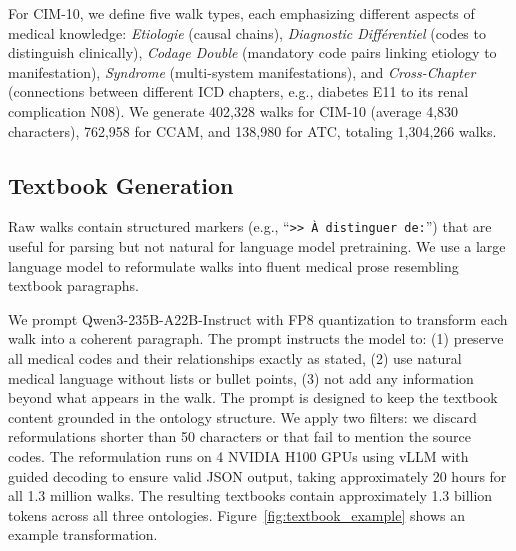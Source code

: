 \begin{reviewread}
For CIM-10, we define five walk types, each emphasizing different aspects of medical knowledge: \textit{Etiologie} (causal chains), \textit{Diagnostic Diff\'erentiel} (codes to distinguish clinically), \textit{Codage Double} (mandatory code pairs linking etiology to manifestation), \textit{Syndrome} (multi-system manifestations), and \textit{Cross-Chapter} (connections between different ICD chapters, e.g., diabetes E11 to its renal complication N08). We generate 402,328 walks for CIM-10 (average 4,830 characters), 762,958 for CCAM, and 138,980 for ATC, totaling 1,304,266 walks.
\end{reviewread}

\subsection{Textbook Generation}
\label{sec:textbook}

\begin{reviewread}
Raw walks contain structured markers (e.g., ``\texttt{>> \`A distinguer de:}'') that are useful for parsing but not natural for language model pretraining. We use a large language model to reformulate walks into fluent medical prose resembling textbook paragraphs.
\end{reviewread}

\begin{reviewread}
We prompt Qwen3-235B-A22B-Instruct \citep{yang2025qwen3} with FP8 quantization to transform each walk into a coherent paragraph. The prompt instructs the model to: (1) preserve all medical codes and their relationships exactly as stated, (2) use natural medical language without lists or bullet points, (3) not add any information beyond what appears in the walk. The prompt is designed to keep the textbook content grounded in the ontology structure. We apply two filters: we discard reformulations shorter than 50 characters or that fail to mention the source codes. The reformulation runs on 4 NVIDIA H100 GPUs using vLLM \citep{kwon2023vllm} with guided decoding to ensure valid JSON output, taking approximately 20 hours for all 1.3 million walks. The resulting textbooks contain approximately 1.3 billion tokens across all three ontologies. Figure~\ref{fig:textbook_example} shows an example transformation.
\end{reviewread}

